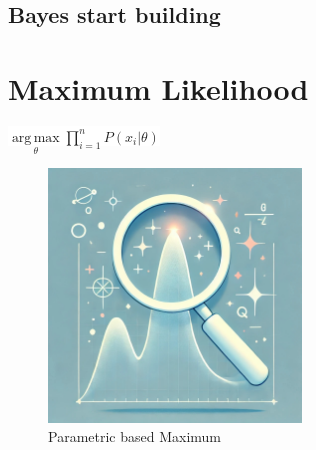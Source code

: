 \documentclass[
  12 pt,
  a4paper,
]{book}
\numberwithin{equation}{section}
\theoremstyle{plain}      %
\theoremstyle{definition} %
\theoremstyle{remark}     %
\theoremstyle{note}         %
\begin{document}
\hypertarget{bayes-start-building}{%
\section{Bayes start building}\label{bayes-start-building}}


\newpage

\hypertarget{maximum-likelihood}{%
\chapter{Maximum Likelihood}\label{maximum-likelihood}}

\begin{center}
\colorbox{white}{\color{navyimpactblue} \huge $\underset{\theta}{\mathop{\mathrm{arg\,max}}} \prod_{i=1}^n P(x_i | \theta)$}
\end{center}

\hfill\break

\begin{figure}[h!]
  \begin{center}
    \includegraphics[width=0.6\textwidth]{pictures/Whimsical-8-MLE.jpeg}
    \caption*{\Large Parametric based Maximum}
  \end{center}
\end{figure}

\newpage

\vspace*{\fill}
\end{document}
